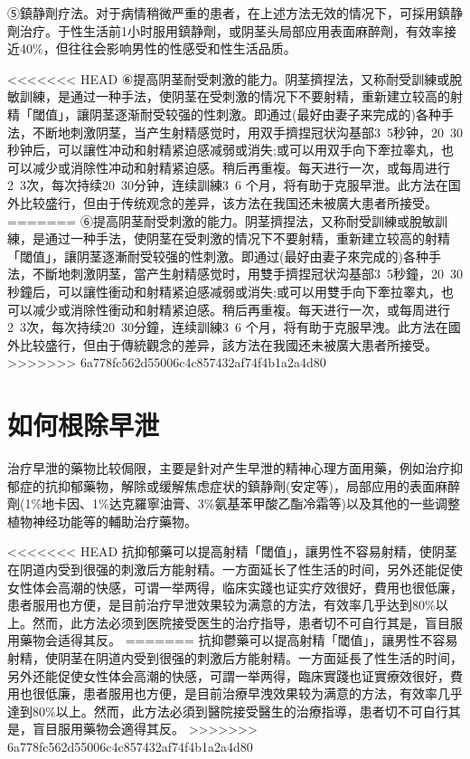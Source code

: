 \documentclass[12pt,UTF8]{ctexbook}
\begin{document}
⑤鎮静劑疗法。对于病情稍微严重的患者，在上述方法无效的情况下，可採用鎮静劑治疗。于性生活前1小时服用鎮静劑，或阴茎头局部应用表面麻醉劑，有效率接近40\%，但往往会影响男性的性感受和性生活品质。

<<<<<<< HEAD
⑥提高阴茎耐受刺激的能力。阴茎擠捏法，又称耐受訓練或脫敏訓練，是通过一种手法，使阴茎在受刺激的情况下不要射精，重新建立较高的射精「閾值」，讓阴茎逐渐耐受较强的性刺激。即通过(最好由妻子来完成的)各种手法，不断地刺激阴茎，当产生射精感觉时，用双手擠捏冠状沟基部3~5秒钟，20~30秒钟后，可以讓性冲动和射精紧迫感减弱或消失;或可以用双手向下牽拉睾丸，也可以减少或消除性冲动和射精紧迫感。稍后再重複。每天进行一次，或每周进行2~3次，每次持续20~30分钟，连续訓練3~6 个月，将有助于克服早泄。此方法在国外比较盛行，但由于传统观念的差异，该方法在我国还未被廣大患者所接受。
=======
⑥提高阴茎耐受刺激的能力。阴茎擠捏法，又称耐受訓練或脫敏訓練，是通过一种手法，使阴茎在受刺激的情况下不要射精，重新建立较高的射精「閾值」，讓阴茎逐漸耐受较强的性刺激。即通过(最好由妻子來完成的)各种手法，不斷地刺激阴茎，當产生射精感觉时，用雙手擠捏冠状沟基部3~5秒鐘，20~30秒鐘后，可以讓性衝动和射精紧迫感减弱或消失;或可以用雙手向下牽拉睾丸，也可以减少或消除性衝动和射精紧迫感。稍后再重複。每天进行一次，或每周进行2~3次，每次持续20~30分鐘，连续訓練3~6 个月，将有助于克服早洩。此方法在國外比较盛行，但由于傳統觀念的差异，該方法在我國还未被廣大患者所接受。
>>>>>>> 6a778fc562d55006c4c857432af74f4b1a2a4d80

\section{如何根除早泄}

治疗早泄的藥物比较侷限，主要是針对产生早泄的精神心理方面用藥，例如治疗抑郁症的抗抑郁藥物，解除或缓解焦虑症状的鎮静劑(安定等)，局部应用的表面麻醉劑(1\%地卡因、1\%达克羅寧油膏、3\%氨基苯甲酸乙酯冷霜等)以及其他的一些调整植物神经功能等的輔助治疗藥物。

<<<<<<< HEAD
抗抑郁藥可以提高射精「閾值」，讓男性不容易射精，使阴茎在阴道内受到很强的刺激后方能射精。一方面延长了性生活的时间，另外还能促使女性体会高潮的快感，可谓一举两得，临床实踐也证实疗效很好，費用也很低廉，患者服用也方便，是目前治疗早泄效果较为满意的方法，有效率几乎达到80\%以上。然而，此方法必须到医院接受医生的治疗指导，患者切不可自行其是，盲目服用藥物会适得其反。
=======
抗抑鬱藥可以提高射精「閾值」，讓男性不容易射精，使阴茎在阴道内受到很强的刺激后方能射精。一方面延長了性生活的时间，另外还能促使女性体会高潮的快感，可謂一举两得，臨床實踐也证實療效很好，費用也很低廉，患者服用也方便，是目前治療早洩效果较为满意的方法，有效率几乎達到80\%以上。然而，此方法必須到醫院接受醫生的治療指導，患者切不可自行其是，盲目服用藥物会適得其反。
>>>>>>> 6a778fc562d55006c4c857432af74f4b1a2a4d80
\end{document}
